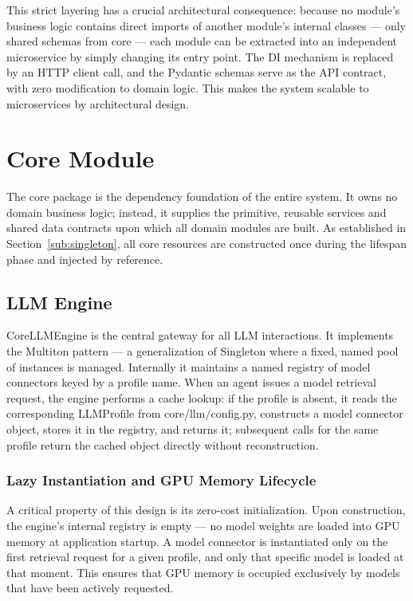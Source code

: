 This strict layering has a crucial architectural consequence: because no module's business logic contains direct imports of another module's internal classes — only shared schemas from  {core} — each module can be extracted into an independent microservice by simply changing its entry point. The DI mechanism is replaced by an HTTP client call, and the Pydantic schemas serve as the API contract, with zero modification to domain logic. This makes the system  {scalable to microservices} by architectural design.



\section{Core Module}\label{sec:core}

The  {core} package is the dependency foundation of the entire system. It owns no domain business logic; instead, it supplies the primitive, reusable services 
and shared data contracts upon which all domain modules are built. As established in Section~\ref{sub:singleton}, all  {core} resources are constructed once 
during the lifespan phase and injected by reference.

\subsection{LLM Engine}

 {CoreLLMEngine} is the central gateway for all LLM interactions. It implements
the  {Multiton} pattern --- a generalization of Singleton where a fixed, named pool
of instances is managed. Internally it maintains a named registry of model connectors
keyed by a profile name. When an agent issues a model retrieval request, the
engine performs a cache lookup: if the profile is absent, it reads the corresponding
 {LLMProfile} from  {core/llm/config.py}, constructs a model connector
object, stores it in the registry, and returns it; subsequent calls for the same
profile return the cached object directly without reconstruction.

\subsubsection*{Lazy Instantiation and GPU Memory Lifecycle}

A critical property of this design is its  {zero-cost initialization}. Upon
construction, the engine's internal registry is empty --- no model weights are loaded
into GPU memory at application startup. A model connector is instantiated only on the
first retrieval request for a given profile, and only that specific model is loaded at
that moment. This ensures that GPU memory is occupied exclusively by models that have
been actively requested.

